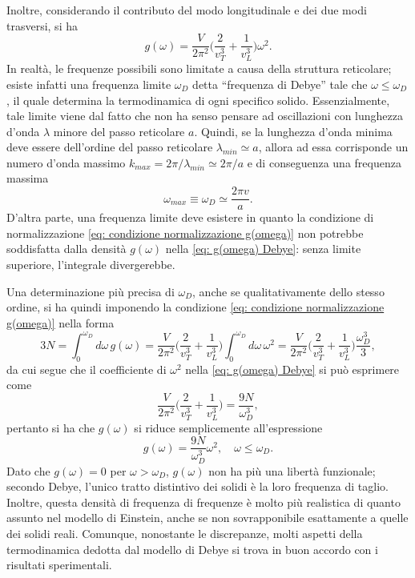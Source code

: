 Inoltre, considerando il contributo del modo longitudinale e dei due modi trasversi, si ha
\begin{equation}
\label{eq: g(omega) Debye}
    g(\omega) = \frac{V}{2\pi^2}\bigg(\frac{2}{v_T^3} + \frac{1}{v_L^3}\bigg)\omega^2.
\end{equation}
In realtà, le frequenze possibili sono limitate a causa della struttura reticolare; esiste infatti una frequenza limite $\omega_D$ detta ``frequenza di Debye'' tale che $\omega \le \omega_D$, il quale determina la termodinamica di ogni specifico solido. Essenzialmente, tale limite viene dal fatto che non ha senso pensare ad oscillazioni con lunghezza d'onda $\lambda$ minore del passo reticolare $a$. Quindi, se la lunghezza d'onda minima deve essere dell'ordine del passo reticolare $\lambda_{min} \simeq a$, allora ad essa corrisponde un numero d'onda massimo $k_{max} = 2\pi/\lambda_{min} \simeq 2\pi/a$ e di conseguenza una frequenza massima 
\begin{equation}
    \omega_{max} \equiv \omega_D \simeq \frac{2\pi v}{a}.
\end{equation}
D'altra parte, una frequenza limite deve esistere in quanto la condizione di normalizzazione \eqref{eq: condizione normalizzazione g(omega)} non potrebbe soddisfatta dalla densità $g(\omega)$ nella \eqref{eq: g(omega) Debye}: senza limite superiore, l'integrale divergerebbe. 

Una determinazione più precisa di $\omega_D$, anche se qualitativamente dello stesso ordine, si ha quindi imponendo la condizione \eqref{eq: condizione normalizzazione g(omega)} nella forma
\begin{equation}
    3N = \int_0^{\omega_D}d\omega\,g(\omega) = \frac{V}{2\pi^2}\bigg(\frac{2}{v_T^3} + \frac{1}{v_L^3}\bigg)\int_0^{\omega_D} d\omega\,\omega^2 = \frac{V}{2\pi^2}\bigg(\frac{2}{v_T^3} + \frac{1}{v_L^3}\bigg)\frac{\omega_D^3}{3},
\end{equation}
da cui segue che il coefficiente di $\omega^2$ nella \eqref{eq: g(omega) Debye} si può esprimere come 
\begin{equation}
    \frac{V}{2\pi^2}\bigg(\frac{2}{v_T^3} + \frac{1}{v_L^3}\bigg) = \frac{9N}{\omega_D^3},
\end{equation}
pertanto si ha che $g(\omega)$ si riduce semplicemente all'espressione
\begin{equation}
    g(\omega) = \frac{9N}{\omega_D^3}\omega^2,\quad \omega \le \omega_D.
\end{equation}
Dato che $g(\omega) = 0$ per $\omega > \omega_D$, $g(\omega)$ non ha più una libertà funzionale; secondo Debye, l'unico tratto distintivo dei solidi è la loro frequenza di taglio. Inoltre, questa densità di frequenza di frequenze è molto più realistica di quanto assunto nel modello di Einstein, anche se non sovrapponibile esattamente a quelle dei solidi reali. Comunque, nonostante le discrepanze, molti aspetti della termodinamica dedotta dal modello di Debye si trova in buon accordo con i risultati sperimentali. 

